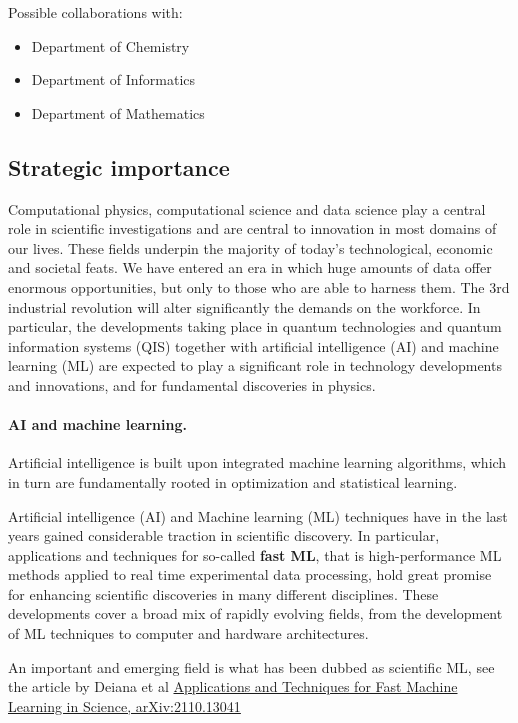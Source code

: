 \documentclass[%
oneside,                 %
final,                   %
10pt]{article}
\begin{document}
Possible collaborations with:

\begin{itemize}
\item Department of Chemistry

\item Department of Informatics

\item Department of Mathematics
\end{itemize}

\noindent
\subsection*{Strategic importance}

Computational physics, computational science and data science play a
central role in scientific investigations and are central to
innovation in most domains of our lives. These fields underpin the
majority of today's technological, economic and societal feats. We
have entered an era in which huge amounts of data offer enormous
opportunities, but only to those who are able to harness them. The 3rd
industrial revolution will alter significantly the demands on the
workforce. In particular, the developments taking place in quantum
technologies and quantum information systems (QIS) together with
artificial intelligence (AI) and machine learning (ML) are expected to
play a significant role in technology developments and innovations,
and for fundamental discoveries in physics.

\paragraph{AI and machine learning.}
Artificial
intelligence is built upon integrated machine learning algorithms,
which in turn are fundamentally rooted in optimization and statistical
learning.

Artificial intelligence (AI) and Machine learning (ML)  techniques
have in the last years gained considerable traction in
scientific discovery. In particular, applications and techniques for
so-called \textbf{fast ML}, that is high-performance ML methods applied
to real time experimental data processing, hold great promise for
enhancing scientific discoveries in many different disciplines.
These developments cover a broad mix of rapidly
evolving fields, from the development of ML techniques to computer and
hardware architectures.

An important and emerging field is what has been dubbed as scientific ML, see the article by Deiana et al \href{{https://arxiv.org/abs/2110.13041}}{Applications and Techniques for Fast Machine Learning in Science, arXiv:2110.13041}
\end{document}
